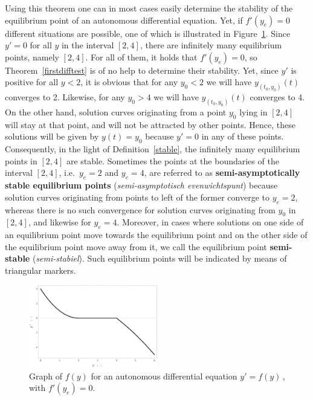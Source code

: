 Using this theorem one can in most cases easily determine the stability of the equilibrium point of an autonomous differential equation. Yet, if $f'\left(y_e\right)=0$ different situations are possible, one of which is illustrated in Figure~\ref{First_Diff_Test0}. Since $y'=0$ for all $y$ in the interval $[2,4]$, there are infinitely many equilibrium points, namely $[2,4]$. For all of them, it holds that $f'\left(y_e\right)=0$, so Theorem~\ref{firstdifftest} is of no help to determine their stability. Yet, since $y'$ is positive for all $y<2$, it is obvious that for any $y_0<2$ we will have $y_{(t_0,y_0)}(t)$ converges to 2. Likewise, for any $y_0>4$ we will have $y_{(t_0,y_0)}(t)$ converges to 4. On the other hand, solution curves originating from a point $y_0$ lying in $[2,4]$ will stay at that point, and will not be attracted by other points. Hence, these solutions will be given by $y(t)=y_0$ because $y'=0$ in any of these points. Consequently, in the light of Definition~\ref{stable}, the infinitely many equilibrium points in $[2,4]$ are stable. Sometimes the points at the boundaries of the interval $[2,4]$, i.e.\ $y_e=2$ and $y_e=4$, are referred to as \textbf{semi-asymptotically stable equilibrium points} (\textit{semi-asymptotisch evenwichtspunt}) because solution curves originating from points to left of the former converge to $y_e=2$, whereas there is no such convergence for solution curves originating from $y_0$ in $[2,4]$, and likewise for $y_e=4$. Moreover, in cases where solutions on one side of an equilibrium point move towards the equilibrium point and on the other side of the equilibrium point move away from it, we call the equilibrium point \textbf{semi-stable} (\textit{semi-stabiel}). Such equilibrium points will be indicated by means of triangular markers. 

\begin{figure}[H]
	\begin{center}
			\includegraphics[width=0.5\textwidth]{First_Diff_Test0.pdf}
	\caption{Graph of $f(y)$ for an autonomous differential equation $y'=f\left(y\right)\,$, with $f'\left(y_e\right)=0$.}
	\label{First_Diff_Test0}
	\end{center}
\end{figure}

